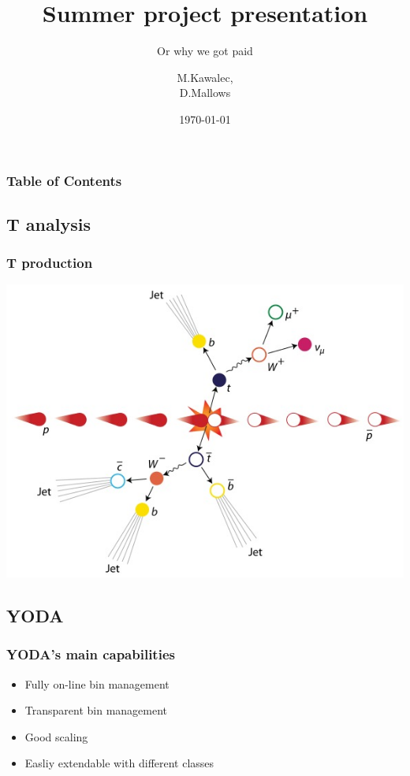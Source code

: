 \documentclass{beamer}
\title{Summer project presentation}
\subtitle{Or why we got paid}
\author{M.Kawalec, \\ D.Mallows}
\date{\today}
\begin{document}
  \frame{\titlepage}

  \begin{frame}
    \frametitle{Table of Contents}
    \tableofcontents
  \end{frame}

  \begin{frame}
    \section{T analysis}
    \frametitle{T production}
    \includegraphics[height=0.89\textheight]{ttbar.jpg}
  \end{frame}
  \begin{frame}
    \section{YODA}
    \frametitle{YODA's main capabilities} 
      \begin{itemize}
        \item Fully on-line bin management \pause
        \item Transparent bin management \pause
        \item Good scaling \pause
        \item Easliy extendable with different classes
      \end{itemize}
  \end{frame}
\end{document}
